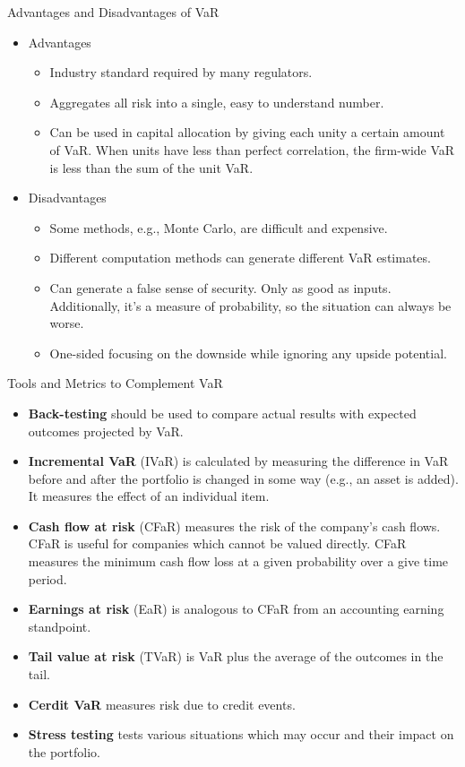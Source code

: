 \documentclass[../custom,grid]{flashcards}
\newcommand{\studyArea}{Risk Management}
\begin{document}
\begin{flashcard}[\studyArea]{Advantages and Disadvantages of VaR}
    \begin{itemize}
        \item Advantages
        \begin{itemize}
            \item Industry standard required by many regulators.
            \item Aggregates all risk into a single, easy to understand number.
            \item Can be used in capital allocation by giving each unity a certain amount of VaR. When units have less than perfect correlation, the firm-wide VaR is less than the sum of the unit VaR.
        \end{itemize}
        \item Disadvantages
        \begin{itemize}
            \item Some methods, e.g., Monte Carlo, are difficult and expensive.
            \item Different computation methods can generate different VaR estimates.
            \item Can generate a false sense of security. Only as good as inputs. Additionally, it's a measure of probability, so the situation can always be worse.
            \item One-sided focusing on the downside while ignoring any upside potential.
        \end{itemize}
    \end{itemize}
\end{flashcard}

\begin{flashcard}[\studyArea]{Tools and Metrics to Complement VaR}
    \begin{itemize}
        \item \textbf{Back-testing} should be used to compare actual results with expected outcomes projected by VaR.
        \item \textbf{Incremental VaR} (IVaR) is calculated by measuring the difference in VaR before and after the portfolio is changed in some way (e.g., an asset is added). It measures the effect of an individual item.
        \item \textbf{Cash flow at risk} (CFaR) measures the risk of the company's cash flows. CFaR is useful for companies which cannot be valued directly. CFaR measures the minimum cash flow loss at a given probability over a give time period.
        \item \textbf{Earnings at risk} (EaR) is analogous to CFaR from an accounting earning standpoint.
        \item \textbf{Tail value at risk} (TVaR) is VaR plus the average of the outcomes in the tail.
        \item \textbf{Cerdit VaR} measures risk due to credit events.
        \item \textbf{Stress testing} tests various situations which may occur and their impact on the portfolio.
    \end{itemize}
\end{flashcard}
\end{document}

